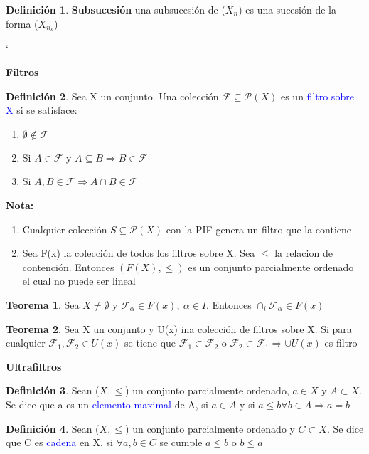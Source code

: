 \documentclass{article}
\theoremstyle{definition}
\newtheorem{definition}{Definición}[section]
\newtheorem{theorem}{Teorema}[section]
\begin{document}
\begin{definition}
	\textbf{Subsucesión } una subsucesión de ($X_n$) es una sucesión de la forma ($X_{n_k}$)
\end{definition}
\newpage`
\begin{LARGE}
	\textbf{Filtros}
\end{LARGE}
\begin{definition}
	Sea X un conjunto. Una colección $\mathcal{F}\subseteq \mathcal{P}(X)$ es un \textcolor{blue}{filtro sobre X} si se satisface:
	\begin{enumerate}
		\item $\emptyset\not\in \mathcal{F}$
		\item Si $A\in \mathcal{F}$ y $A\subseteq B\Rightarrow B\in \mathcal{F}$
		\item Si $A,B\in\mathcal{F}\Rightarrow A\cap B\in \mathcal{F}$
	\end{enumerate}	 
\end{definition}
\textbf{Nota: }
\begin{enumerate}
	\item Cualquier colección $S\subseteq \mathcal{P}(X)$ con la PIF genera un filtro que la contiene
	\item Sea F(x) la colección de todos los filtros sobre X. Sea $\leq$ la relacion de contención. Entonces $(F(X),\leq)$ es un conjunto parcialmente ordenado el cual no puede ser lineal
\end{enumerate}
\begin{theorem}
	Sea $X\neq\emptyset$ y $\mathcal{F}_{\alpha}\in F(x),\ \alpha\in I$. Entonces $\cap_i\mathcal{F}_{\alpha}\in F(x)$
\end{theorem}
\begin{theorem}
	Sea X un conjunto y U(x) ina colección de filtros sobre X. Si para cualquier $\mathcal{F}_1,\mathcal{F}_2\in U(x)$ se tiene que $\mathcal{F}_1\subset\mathcal{F}_2$ o $\mathcal{F}_2\subset\mathcal{F}_1\Rightarrow \cup U(x)$ es filtro
\end{theorem}
\begin{LARGE}
	\textbf{Ultrafiltros}
\end{LARGE}
\begin{definition}
	Sean ($X,\leq$) un conjunto parcialmente ordenado, $a\in X$ y $A\subset X$. Se dice que a es un \textcolor{blue}{elemento maximal} de A, si $a\in A$ y si $a\leq b\forall b\in A\Rightarrow a=b$
\end{definition}
\begin{definition}
	Sean ($X,\leq$) un conjunto parcialmente ordenado y $C\subset X$. Se dice que C es \textcolor{blue}{cadena} en X, si $\forall a,b\in C$ se cumple $a\leq b$ o $b\leq a$
\end{definition}
\end{document}
